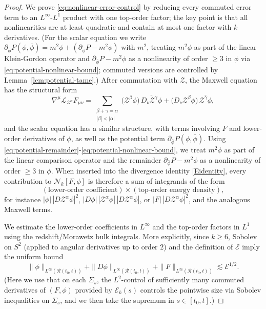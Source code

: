 \documentclass[11pt]{article}
\numberwithin{equation}{section}
\theoremstyle{plain}
\theoremstyle{definition}
\theoremstyle{remark}
\begin{document}
\begin{proof}
We prove \eqref{eq:nonlinear-error-control} by reducing every commuted error term to an $L^{\infty}$-$L^{1}$ product with one top-order factor; the key point is that all nonlinearities are at least quadratic and contain at most one factor with $k$ derivatives. (For the scalar equation we write $\partial_{\bar\phi}P(\phi,\bar\phi)=m^{2}\phi+(\partial_{\bar\phi}P-m^{2}\phi)$ with $m^{2}$, treating $m^{2}\phi$ as part of the linear Klein-Gordon operator and $\partial_{\bar\phi}P-m^{2}\phi$ as a nonlinearity of order $\ge 3$ in $\phi$ via \eqref{eq:potential-nonlinear-bound}; commuted versions are controlled by Lemma~\ref{lem:potential-tame}.)
After commutation with $\mathcal Z$, the Maxwell equation has the structural form
\begin{equation}
\nabla^\mu \mathcal L_{\mathcal Z^\alpha}F_{\mu\nu}
=
\sum_{\substack{\beta+\gamma=\alpha\\ |\beta|<|\alpha|}}
\bigl(\mathcal Z^{\beta}\phi\bigr)\,\overline{D_\nu \mathcal Z^{\gamma}\phi}
+
\bigl(D_\nu \mathcal Z^{\beta}\phi\bigr)\,\overline{\mathcal Z^{\gamma}\phi},
\end{equation}
and the scalar equation has a similar structure, with terms involving $F$ and lower-order derivatives of $\phi$, as well as the potential term $\partial_{\bar\phi}P(\phi,\bar\phi)$. Using \eqref{eq:potential-remainder}-\eqref{eq:potential-nonlinear-bound}, we treat $m^{2}\phi$ as part of the linear comparison operator and the remainder $\partial_{\bar\phi}P-m^{2}\phi$ as a nonlinearity of order $\ge 3$ in $\phi$.
When inserted into the divergence identity \eqref{Eidentity}, every contribution to $\mathcal N_{k}[F,\phi]$ is therefore a sum of integrands of the form
\begin{equation}
(\text{lower-order coefficient})\times (\text{top-order energy density}),
\end{equation}
for instance $|\phi|\,|D\mathcal Z^\alpha\phi|^{2}$, $|D\phi|\,|\mathcal Z^\alpha\phi|\,|D\mathcal Z^\alpha\phi|$, or $|F|\,|D\mathcal Z^\alpha\phi|^{2}$, and the analogous Maxwell terms.

We estimate the lower-order coefficients in $L^\infty$ and the top-order factors in $L^{1}$ using the redshift/Morawetz bulk integrals.
More explicitly, since $k\ge 6$, Sobolev on $S^{2}$ (applied to angular derivatives up to order $2$) and the definition of $\mathcal E$ imply the uniform bound
\begin{equation}
\|\phi\|_{L^\infty(\mathcal R(t_{0},t))} + \|D\phi\|_{L^\infty(\mathcal R(t_{0},t))} + \|F\|_{L^\infty(\mathcal R(t_{0},t))}
\lesssim
\mathcal E^{1/2}.
\end{equation}
(Here we use that on each $\Sigma_{s}$, the $L^{2}$-control of sufficiently many commuted derivatives of $(F,\phi)$ provided by $\mathcal E_{k}(s)$ controls the pointwise size via Sobolev inequalities on $\Sigma_{s}$, and we then take the supremum in $s\in[t_{0},t]$.)


\end{proof}
\end{document}
